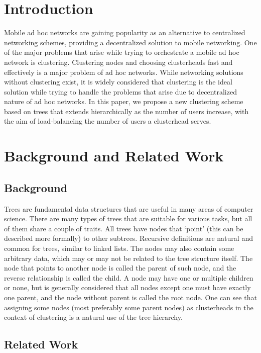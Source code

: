 \documentclass{winslabreport}
\begin{document}
\tableofcontents
\listoffigures
\listoftables
\body

\section{Introduction}

Mobile ad hoc networks are gaining popularity as an alternative to centralized
networking schemes, providing a decentralized solution to mobile networking. One
of the major problems that arise while trying to orchestrate a mobile ad hoc
network is clustering. Clustering nodes and choosing clusterheads fast and
effectively is a major problem of ad hoc networks. While networking solutions
without clustering exist, it is widely considered that clustering is the ideal
solution while trying to handle the problems that arise due to decentralized
nature of ad hoc networks. In this paper, we propose a new clustering scheme
based on trees that extends hierarchically as the number of users increase, with
the aim of load-balancing the number of users a clusterhead serves.

\section{Background and Related Work}

\subsection{Background}

Trees are fundamental data structures that are useful in many areas of computer
science. There are many types of trees that are suitable for various tasks, but
all of them share a couple of traits. All trees have nodes that `point' (this
can be described more formally) to other subtrees. Recursive definitions are
natural and common for trees, similar to linked lists. The nodes may also
contain some arbitrary data, which may or may not be related to the tree
structure itself. The node that points to another node is called the parent of
such node, and the reverse relationship is called the child. A node may have one
or multiple children or none, but is generally considered that all nodes except
one must have exactly one parent, and the node without parent is called the root
node. One can see that assigning some nodes (most preferably some parent nodes)
as clusterheads in the context of clustering is a natural use of the tree
hierarchy.

\subsection{Related Work}
\end{document}

